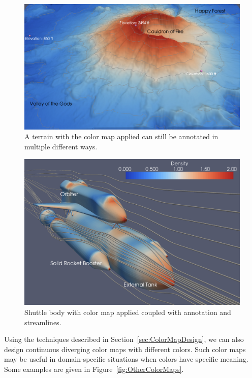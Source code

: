 \documentclass{acmsiggraph}               %
\begin{document}
\begin{figure}
  \centering
  \includegraphics[width=\linewidth]{images/AnnotationExample}
  \caption{A terrain with the color map applied can still be annotated in
    multiple different ways.}
  \label{fig:ColorMapWithAnnotation}
\end{figure}

\begin{figure}
  \centering
  \includegraphics[width=\linewidth]{images/ShuttleExample}
  \caption{Shuttle body with color map applied coupled with annotation and
    streamlines.}
  \label{fig:ColorMapOnShuttle}
\end{figure}

Using the techniques described in Section~\ref{sec:ColorMapDesign}, we can
also design continuous diverging color maps with different colors.  Such
color maps may be useful in domain-specific situations when colors have
specific meaning.  Some examples are given in
Figure~\ref{fig:OtherColorMaps}.
\end{document}
